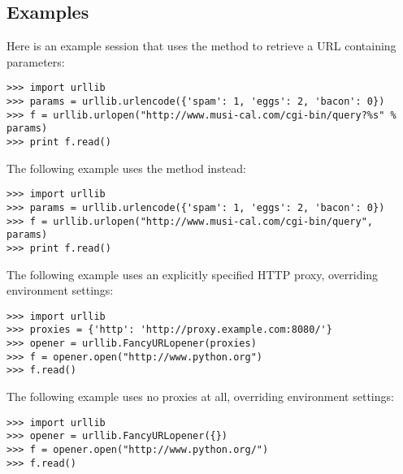 \subsection{Examples}

Here is an example session that uses the  method to retrieve
a URL containing parameters:

\begin{verbatim}
>>> import urllib
>>> params = urllib.urlencode({'spam': 1, 'eggs': 2, 'bacon': 0})
>>> f = urllib.urlopen("http://www.musi-cal.com/cgi-bin/query?%s" % params)
>>> print f.read()
\end{verbatim}

The following example uses the  method instead:

\begin{verbatim}
>>> import urllib
>>> params = urllib.urlencode({'spam': 1, 'eggs': 2, 'bacon': 0})
>>> f = urllib.urlopen("http://www.musi-cal.com/cgi-bin/query", params)
>>> print f.read()
\end{verbatim}

The following example uses an explicitly specified HTTP proxy,
overriding environment settings:

\begin{verbatim}
>>> import urllib
>>> proxies = {'http': 'http://proxy.example.com:8080/'}
>>> opener = urllib.FancyURLopener(proxies)
>>> f = opener.open("http://www.python.org")
>>> f.read()
\end{verbatim}

The following example uses no proxies at all, overriding environment
settings:

\begin{verbatim}
>>> import urllib
>>> opener = urllib.FancyURLopener({})
>>> f = opener.open("http://www.python.org/")
>>> f.read()
\end{verbatim}
